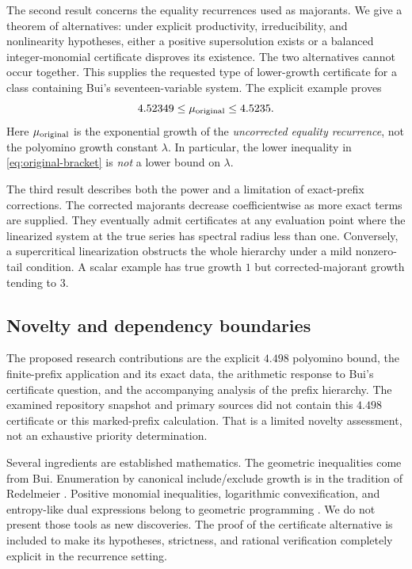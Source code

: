 \documentclass[11pt,a4paper]{article}
\theoremstyle{definition}
\theoremstyle{remark}
\begin{document}
The second result concerns the equality recurrences used as majorants.
We give a theorem of alternatives: under explicit productivity,
irreducibility, and nonlinearity hypotheses, either a positive
supersolution exists or a balanced integer-monomial certificate disproves its
existence. The two alternatives cannot occur together. This supplies the
requested type of lower-growth certificate for a class containing Bui's
seventeen-variable system. The explicit example proves
\begin{equation}\label{eq:original-bracket}
 4.52349\leq\mu_{\rm original}\leq4.5235.
\end{equation}
Here $\mu_{\rm original}$ is the exponential growth of the \emph{uncorrected
equality recurrence}, not the polyomino growth constant $\lambda$.
In particular, the lower inequality in \eqref{eq:original-bracket} is
\emph{not} a lower bound on $\lambda$.

The third result describes both the power and a limitation of exact-prefix
corrections. The corrected majorants decrease coefficientwise as more exact
terms are supplied. They eventually admit certificates at any evaluation
point where the linearized system at the true series has spectral radius
less than one. Conversely, a supercritical linearization obstructs the
whole hierarchy under a mild nonzero-tail condition. A scalar example has
true growth $1$ but corrected-majorant growth tending to $3$.

\subsection{Novelty and dependency boundaries}
The proposed research contributions are the explicit $4.498$ polyomino bound,
the finite-prefix application and its exact data, the arithmetic response to
Bui's certificate question, and the accompanying analysis of the prefix
hierarchy. The examined repository snapshot and primary sources did not
contain this $4.498$ certificate or this marked-prefix calculation. That is a
limited novelty assessment, not an exhaustive priority determination.

Several ingredients are established mathematics. The geometric inequalities
come from Bui. Enumeration by canonical include/exclude growth is in the
tradition of Redelmeier \cite{redelmeier}. Positive monomial inequalities,
logarithmic convexification, and entropy-like dual expressions belong to
geometric programming \cite{duffin,boyd,bv}. We do not present those tools as
new discoveries. The proof of the certificate alternative is included to
make its hypotheses, strictness, and rational verification completely
explicit in the recurrence setting.
\end{document}
